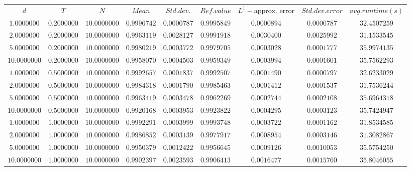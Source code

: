 \begin{tabular}{ccccccccc}
    $d$ & $T$ & $N$ & $Mean$ & $Std. dev.$ & $Ref. value$ & $L^1-$approx. error & $Std. dev. error$ & $avg. runtime (s)$\\
    $1.0000000$ & $0.2000000$ & $10.0000000$ & $0.9996742$ & $0.0000787$ & $0.9995849$ & $0.0000894$ & $0.0000787$ & $32.4507259$\\
    $2.0000000$ & $0.2000000$ & $10.0000000$ & $0.9963119$ & $0.0028127$ & $0.9991918$ & $0.0030400$ & $0.0025992$ & $31.1533545$\\
    $5.0000000$ & $0.2000000$ & $10.0000000$ & $0.9980219$ & $0.0003772$ & $0.9979705$ & $0.0003028$ & $0.0001777$ & $35.9974135$\\
    $10.0000000$ & $0.2000000$ & $10.0000000$ & $0.9958070$ & $0.0004503$ & $0.9959349$ & $0.0003994$ & $0.0001601$ & $35.7562293$\\
    $1.0000000$ & $0.5000000$ & $10.0000000$ & $0.9992657$ & $0.0001837$ & $0.9992507$ & $0.0001490$ & $0.0000797$ & $32.6233029$\\
    $2.0000000$ & $0.5000000$ & $10.0000000$ & $0.9984318$ & $0.0001790$ & $0.9985463$ & $0.0001412$ & $0.0001537$ & $31.7536244$\\
    $5.0000000$ & $0.5000000$ & $10.0000000$ & $0.9963419$ & $0.0003478$ & $0.9962269$ & $0.0002744$ & $0.0002108$ & $35.6964318$\\
    $10.0000000$ & $0.5000000$ & $10.0000000$ & $0.9920168$ & $0.0003953$ & $0.9923822$ & $0.0004295$ & $0.0003123$ & $35.7424947$\\
    $1.0000000$ & $1.0000000$ & $10.0000000$ & $0.9992291$ & $0.0003999$ & $0.9993748$ & $0.0003722$ & $0.0001162$ & $31.8534585$\\
    $2.0000000$ & $1.0000000$ & $10.0000000$ & $0.9986852$ & $0.0003139$ & $0.9977917$ & $0.0008954$ & $0.0003146$ & $31.3082867$\\
    $5.0000000$ & $1.0000000$ & $10.0000000$ & $0.9950379$ & $0.0012422$ & $0.9956645$ & $0.0009126$ & $0.0010053$ & $35.5754250$\\
    $10.0000000$ & $1.0000000$ & $10.0000000$ & $0.9902397$ & $0.0023593$ & $0.9906413$ & $0.0016477$ & $0.0015760$ & $35.8046055$\\
    \end{tabular}
    